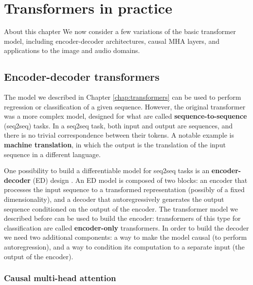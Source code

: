 \chapter{Transformers in practice}
\label{chap:transformers_in_practice}

\begin{supportbox}{About this chapter}
We now consider a few variations of the basic transformer model, including encoder-decoder architectures, causal MHA layers, and applications to the image and audio domains.
\end{supportbox}

\section{Encoder-decoder transformers}

The model we described in Chapter \ref{chap:transformers} can be used to perform regression or classification of a given sequence. However, the original transformer \cite{vaswani2017attention} was a more complex model, designed for what are called \textbf{sequence-to-sequence} (seq2seq) tasks. In a seq2seq task, both input and output are sequences, and there is no trivial correspondence between their tokens. A notable example is \textbf{machine translation}, in which the output is the translation of the input sequence in a different language.

One possibility to build a differentiable model for seq2seq tasks is an \textbf{encoder-decoder} (ED) design \cite{sutskever2014sequence}. An ED model is composed of two blocks: an encoder that processes the input sequence to a transformed representation (possibly of a fixed dimensionality), and a decoder that autoregressively generates the output sequence conditioned on the output of the encoder. The transformer model we described before can be used to build the encoder: transformers of this type for classification are called \textbf{encoder-only} transformers. In order to build the decoder we need two additional components: a way to make the model causal (to perform autoregression), and a way to condition its computation to a separate input (the output of the encoder).

\subsection{Causal multi-head attention} \addclock

